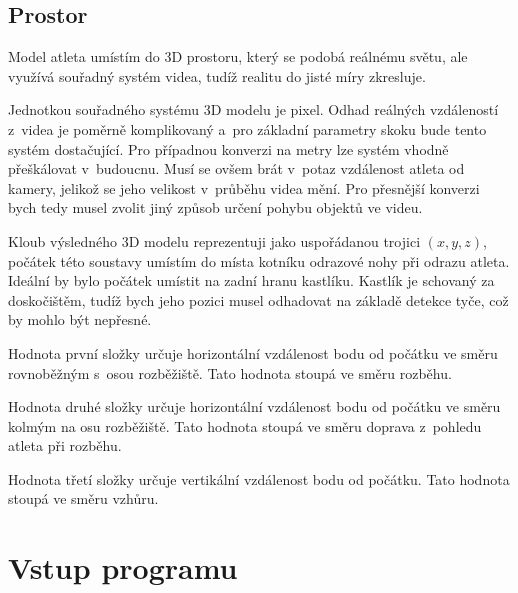 



\subsection{Prostor}

Model atleta umístím do 3D prostoru, který se podobá reálnému světu, ale využívá souřadný systém videa, tudíž realitu do jisté míry zkresluje.

Jednotkou souřadného systému 3D modelu je pixel. Odhad reálných vzdáleností z~videa je poměrně komplikovaný a~pro základní parametry skoku bude tento systém dostačující. Pro případnou konverzi na metry lze systém vhodně přeškálovat v~budoucnu. Musí se ovšem brát v~potaz vzdálenost atleta od kamery, jelikož se jeho velikost v~průběhu videa mění. Pro přesnější konverzi bych tedy musel zvolit jiný způsob určení pohybu objektů ve videu.

Kloub výsledného 3D modelu reprezentuji jako uspořádanou trojici $(x,y,z)$, počátek této soustavy umístím do místa kotníku odrazové nohy při odrazu atleta. Ideální by bylo počátek umístit na zadní hranu kastlíku. Kastlík je schovaný za doskočištěm, tudíž bych jeho pozici musel odhadovat na základě detekce tyče, což by mohlo být nepřesné.

Hodnota první složky určuje horizontální vzdálenost bodu od počátku ve směru rovnoběžným s~osou rozběžiště. Tato hodnota stoupá ve směru rozběhu.

Hodnota druhé složky určuje horizontální vzdálenost bodu od počátku ve směru kolmým na osu rozběžiště. Tato hodnota stoupá ve směru doprava z~pohledu atleta při rozběhu.

Hodnota třetí složky určuje vertikální vzdálenost bodu od počátku. Tato hodnota stoupá ve směru vzhůru.





\section{Vstup programu}

